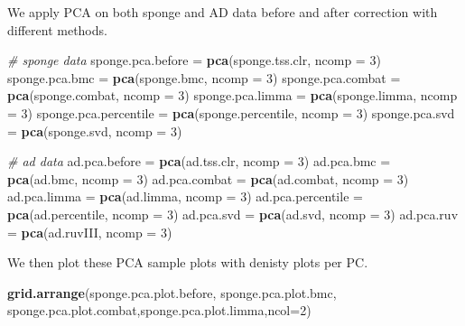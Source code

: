 \documentclass[]{book}
\newenvironment{Shaded}{\begin{snugshade}}{\end{snugshade}}
\newcommand{\KeywordTok}[1]{\textcolor[rgb]{0.13,0.29,0.53}{\textbf{#1}}}
\newcommand{\DataTypeTok}[1]{\textcolor[rgb]{0.13,0.29,0.53}{#1}}
\newcommand{\DecValTok}[1]{\textcolor[rgb]{0.00,0.00,0.81}{#1}}
\newcommand{\StringTok}[1]{\textcolor[rgb]{0.31,0.60,0.02}{#1}}
\newcommand{\CommentTok}[1]{\textcolor[rgb]{0.56,0.35,0.01}{\textit{#1}}}
\newcommand{\NormalTok}[1]{#1}
\begin{document}
We apply PCA on both sponge and AD data before and after correction with
different methods.

\begin{Shaded}
\begin{Highlighting}[]
\CommentTok{# sponge data}
\NormalTok{sponge.pca.before =}\StringTok{ }\KeywordTok{pca}\NormalTok{(sponge.tss.clr, }\DataTypeTok{ncomp =} \DecValTok{3}\NormalTok{)}
\NormalTok{sponge.pca.bmc =}\StringTok{ }\KeywordTok{pca}\NormalTok{(sponge.bmc, }\DataTypeTok{ncomp =} \DecValTok{3}\NormalTok{)}
\NormalTok{sponge.pca.combat =}\StringTok{ }\KeywordTok{pca}\NormalTok{(sponge.combat, }\DataTypeTok{ncomp =} \DecValTok{3}\NormalTok{)}
\NormalTok{sponge.pca.limma =}\StringTok{ }\KeywordTok{pca}\NormalTok{(sponge.limma, }\DataTypeTok{ncomp =} \DecValTok{3}\NormalTok{)}
\NormalTok{sponge.pca.percentile =}\StringTok{ }\KeywordTok{pca}\NormalTok{(sponge.percentile, }\DataTypeTok{ncomp =} \DecValTok{3}\NormalTok{)}
\NormalTok{sponge.pca.svd =}\StringTok{ }\KeywordTok{pca}\NormalTok{(sponge.svd, }\DataTypeTok{ncomp =} \DecValTok{3}\NormalTok{)}

\CommentTok{# ad data}
\NormalTok{ad.pca.before =}\StringTok{ }\KeywordTok{pca}\NormalTok{(ad.tss.clr, }\DataTypeTok{ncomp =} \DecValTok{3}\NormalTok{)}
\NormalTok{ad.pca.bmc =}\StringTok{ }\KeywordTok{pca}\NormalTok{(ad.bmc, }\DataTypeTok{ncomp =} \DecValTok{3}\NormalTok{)}
\NormalTok{ad.pca.combat =}\StringTok{ }\KeywordTok{pca}\NormalTok{(ad.combat, }\DataTypeTok{ncomp =} \DecValTok{3}\NormalTok{)}
\NormalTok{ad.pca.limma =}\StringTok{ }\KeywordTok{pca}\NormalTok{(ad.limma, }\DataTypeTok{ncomp =} \DecValTok{3}\NormalTok{)}
\NormalTok{ad.pca.percentile =}\StringTok{ }\KeywordTok{pca}\NormalTok{(ad.percentile, }\DataTypeTok{ncomp =} \DecValTok{3}\NormalTok{)}
\NormalTok{ad.pca.svd =}\StringTok{ }\KeywordTok{pca}\NormalTok{(ad.svd, }\DataTypeTok{ncomp =} \DecValTok{3}\NormalTok{)}
\NormalTok{ad.pca.ruv =}\StringTok{ }\KeywordTok{pca}\NormalTok{(ad.ruvIII, }\DataTypeTok{ncomp =} \DecValTok{3}\NormalTok{)}
\end{Highlighting}
\end{Shaded}

We then plot these PCA sample plots with denisty plots per PC.

\begin{Shaded}
\begin{Highlighting}[]
\KeywordTok{grid.arrange}\NormalTok{(sponge.pca.plot.before, sponge.pca.plot.bmc, sponge.pca.plot.combat,sponge.pca.plot.limma,}\DataTypeTok{ncol=}\DecValTok{2}\NormalTok{)}
\end{Highlighting}
\end{Shaded}
\end{document}
